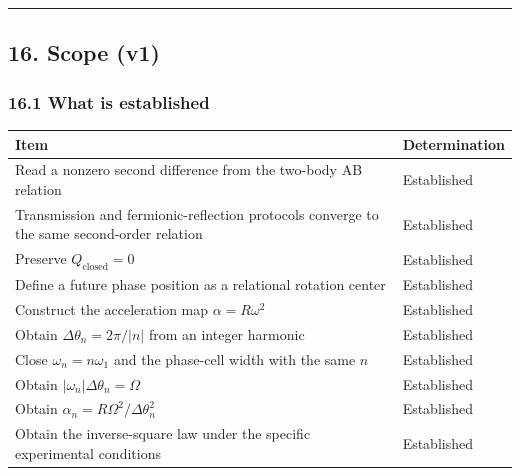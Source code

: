 \documentclass[
  a4paper,
]{article}
\newcounter{none} %
\begin{document}
\begin{center}\rule{0.5\linewidth}{0.5pt}\end{center}

\subsection{16. Scope (v1)}\label{scope-v1}

\subsubsection{16.1 What is established}\label{what-is-established}

{\def\LTcaptype{none} %
\begin{longtable}[]{@{}
  >{\raggedright\arraybackslash}p{}
  >{\raggedright\arraybackslash}p{}@{}}
\toprule\noalign{}
\begin{minipage}[b]{\linewidth}\raggedright
Item
\end{minipage} & \begin{minipage}[b]{\linewidth}\raggedright
Determination
\end{minipage} \\
\midrule\noalign{}
\endhead
\bottomrule\noalign{}
\endlastfoot
Read a nonzero second difference from the two-body AB relation &
Established \\
Transmission and fermionic-reflection protocols converge to the same
second-order relation & Established \\
Preserve \(Q_{\mathrm{closed}}=0\) & Established \\
Define a future phase position as a relational rotation center &
Established \\
Construct the acceleration map \(\alpha=R\omega^2\) & Established \\
Obtain \(\Delta\theta_n=2\pi/\lvert n\rvert\) from an integer harmonic &
Established \\
Close \(\omega_n=n\omega_1\) and the phase-cell width with the same
\(n\) & Established \\
Obtain \(\lvert\omega_n\rvert\Delta\theta_n=\Omega\) & Established \\
Obtain \(\alpha_n=R\Omega^2/\Delta\theta_n^2\) & Established \\
Obtain the inverse-square law under the specific experimental conditions
& Established \\
\end{longtable}
}
\end{document}
